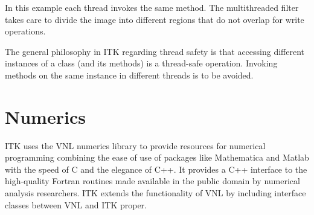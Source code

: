 In this example each thread invokes the same method. The multithreaded filter
takes care to divide the image into different regions that do not overlap for
write operations.

The general philosophy in ITK regarding thread safety is that accessing
different instances of a class (and its methods) is a thread-safe operation.
Invoking methods on the same instance in different threads is to be avoided.


\section{Numerics}
\label{sec:Numerics}


ITK uses the VNL numerics library to provide resources for numerical
programming combining the ease of use of packages like Mathematica and Matlab
with the speed of C and the elegance of C++. It provides a C++ interface to
the high-quality Fortran routines made available in the public domain by
numerical analysis researchers. ITK extends the functionality of VNL
by including interface classes between VNL and ITK proper.

